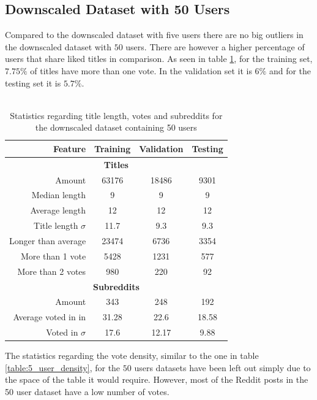 \subsection{Downscaled Dataset with 50 Users}
Compared to the downscaled dataset with five users there are no big outliers in the downscaled dataset with $50$ users. There are however a higher percentage of users that share liked titles in comparison. As seen in table \ref{table:50_user_stats}, for the training set, $7.75\%$ of titles have more than one vote. In the validation set it is $6\%$ and for the testing set it is $5.7\%$.
\\\\
\begin{table}[H]
    \centering
    \begin{tabular}{ r | c | c | c }
    \textbf{Feature} & \textbf{Training} & \textbf{Validation} & \textbf{Testing} \\ \hline \hline
    \multicolumn{4}{c}{\textbf{Titles}} \\ \hline \hline
    Amount & 63176 & 18486 & 9301 \\ \hline
    Median length & 9 & 9 & 9 \\ \hline
    Average length & 12 & 12 & 12  \\ \hline
    Title length $\sigma$ & 11.7 & 9.3 & 9.3 \\ \hline
    Longer than average & 23474 & 6736 & 3354 \\ \hline
    More than 1 vote & 5428 & 1231 & 577 \\ \hline
    More than 2 votes & 980 & 220 & 92\\ \hline \hline
    \multicolumn{4}{c}{\textbf{Subreddits}} \\ \hline \hline
    Amount & 343 & 248 & 192  \\ \hline
    Average voted in in & 31.28 & 22.6 & 18.58 \\ \hline
    Voted in $\sigma$ & 17.6 & 12.17 & 9.88  \\ \hline
    \end{tabular}
    \caption{Statistics regarding title length, votes and subreddits for the downscaled dataset containing 50 users}
    \label{table:50_user_stats}
\end{table}
The statistics regarding the vote density, similar to the one in table \ref{table:5_user_density}, for the $50$ users datasets have been left out simply due to the space of the table it would require. However, most of the Reddit posts in the 50 user dataset have a low number of votes.
